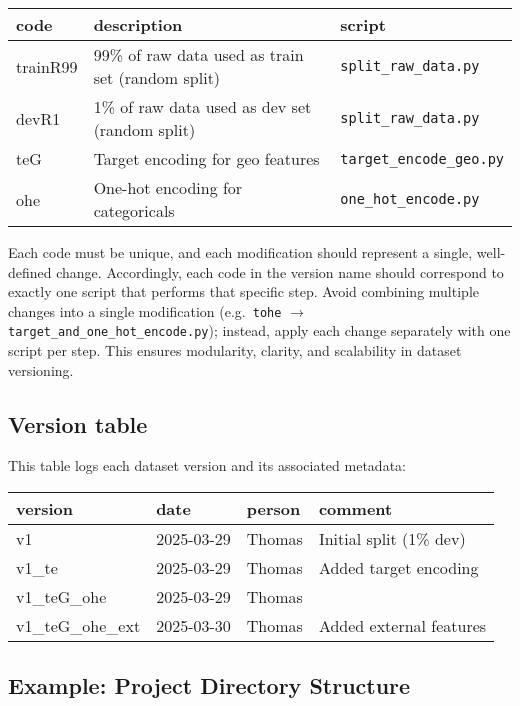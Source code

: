 \documentclass[12pt,openany]{book}
\begin{document}
\renewcommand{\arraystretch}{1.3}
\begin{tabular}{|l|p{9.5cm}|p{4.2cm}|}
\hline
\textbf{code} & \textbf{description} & \textbf{script} \\
\hline
trainR99 & 99\% of raw data used as train set (random split) & \texttt{split\_raw\_data.py} \\
devR1    & 1\% of raw data used as dev set (random split) & \texttt{split\_raw\_data.py} \\
teG       & Target encoding for geo features & \texttt{target\_encode\_geo.py} \\
ohe      & One-hot encoding for categoricals & \texttt{one\_hot\_encode.py} \\
\hline
\end{tabular}
\newline
\newline

Each code must be unique, and each modification should represent a single, well-defined change. Accordingly, each code in the version name should correspond to exactly one script that performs that specific step. Avoid combining multiple changes into a single modification (e.g.\ \texttt{tohe} \(\rightarrow\) \texttt{target\_and\_one\_hot\_encode.py}); instead, apply each change separately with one script per step. This ensures modularity, clarity, and scalability in dataset versioning.



\subsection{Version table}
This table logs each dataset version and its associated metadata:
\newline

\renewcommand{\arraystretch}{1.3}
\begin{tabular}{|l|p{2.5cm}|p{2.5cm}|p{5.5cm}|}
\hline
\textbf{version} & \textbf{date} & \textbf{person} & \textbf{comment} \\
\hline
v1 & 2025-03-29 & Thomas & Initial split (1\% dev) \\
v1\_te & 2025-03-29 & Thomas & Added target encoding \\
v1\_teG\_ohe & 2025-03-29 & Thomas &  \\
v1\_teG\_ohe\_ext & 2025-03-30 & Thomas & Added external features \\
\hline
\end{tabular}


\subsection{Example: Project Directory Structure}
\end{document}
